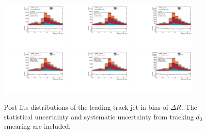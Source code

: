 \begin{figure}[htbp]
  \centering
 \includegraphics[width=0.3\textwidth]{figures/gbb/Sub_Sd0_Fits/Canv_Fit_02-DeltaR-025_coarse_x.pdf}
 \includegraphics[width=0.3\textwidth]{figures/gbb/Sub_Sd0_Fits/Canv_Fit_025-DeltaR-03_coarse_x.pdf}
 \includegraphics[width=0.3\textwidth]{figures/gbb/Sub_Sd0_Fits/Canv_Fit_03-DeltaR-04_coarse_x.pdf}\\
 \includegraphics[width=0.3\textwidth]{figures/gbb/Sub_Sd0_Fits/Canv_Fit_04-DeltaR-05_coarse_x.pdf}
 \includegraphics[width=0.3\textwidth]{figures/gbb/Sub_Sd0_Fits/Canv_Fit_05-DeltaR-06_coarse_x.pdf}
 \includegraphics[width=0.3\textwidth]{figures/gbb/Sub_Sd0_Fits/Canv_Fit_06-DeltaR-07_coarse_x.pdf}\\

\caption{Post-fits \subsdzero distributions of the leading track jet in bins of $\Delta R$. The statistical uncertainty and systematic uncertainty from tracking $d_0$ smearing are included.}
  \label{fig:dR-postfits-leading-sub}
\end{figure}


